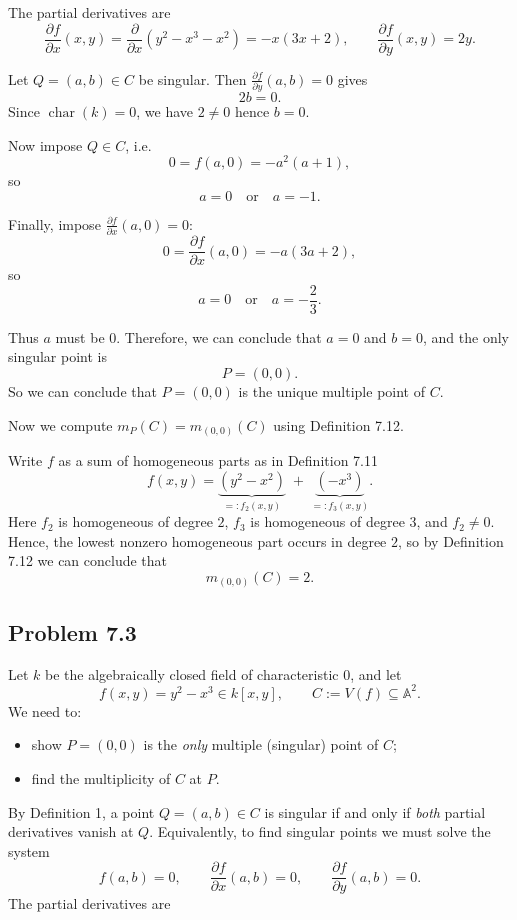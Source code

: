 \documentclass[a4paper,12pt,openany]{article}
\theoremstyle{plain}
\theoremstyle{definition}
\theoremstyle{remark}
\begin{document}
The partial derivatives are 
\[
\frac{\partial f}{\partial x}(x,y)=\frac{\partial}{\partial x}(y^2-x^3-x^2)=-x(3x+2),
\qquad
\frac{\partial f}{\partial y}(x,y)=2y.
\]

Let $Q=(a,b)\in C$ be singular. Then $\frac{\partial f}{\partial y}(a,b)=0$ gives
\[
2b=0.
\]
Since $\operatorname{char}(k)=0$, we have $2\neq 0$ hence $b=0$.

Now impose $Q\in C$, i.e.
\[
0=f(a,0)=-a^{2}(a+1),
\]
so
\[
a=0 \quad\text{or}\quad a=-1.
\]

Finally, impose $\frac{\partial f}{\partial x}(a,0)=0$:
\[
0=\frac{\partial f}{\partial x}(a,0)=-a(3a+2),
\]
so
\[
a=0 \quad\text{or}\quad a=-\frac{2}{3}.
\]

Thus $a$ must be $0$.
Therefore, we can conclude that $a=0$ and $b=0$, and the only singular point is
\[
P=(0,0).
\]
So we can conclude that $P=(0,0)$ is the unique multiple point of $C$.

\medskip


Now we compute $m_{P}(C)=m_{(0,0)}(C)$ using Definition 7.12.

Write $f$ as a sum of homogeneous parts as in Definition 7.11
\[
f(x,y)=\underbrace{(y^{2}-x^{2})}_{=:f_{2}(x,y)} \;+\; \underbrace{(-x^{3})}_{=:f_{3}(x,y)}.
\]
Here $f_2$ is homogeneous of degree $2$, $f_3$ is homogeneous of degree $3$, and $f_2\neq 0$.
Hence, the lowest nonzero homogeneous part occurs in degree $2$, so by Definition 7.12 we can conclude that
\[
m_{(0,0)}(C)=2.
\]



\subsection*{Problem 7.3}

Let $k$ be the algebraically closed field of characteristic $0$, and let
\[
f(x,y)=y^{2}-x^{3}\in k[x,y],
\qquad
C:= V(f)\subseteq \mathbb{A}^{2}.
\]
We need to:
\begin{itemize}
\item[i)]  show $P=(0,0)$ is the \emph{only} multiple (singular) point of $C$;
\item[ii)] find the multiplicity of $C$ at $P$.
\end{itemize}

\medskip

By Definition 1, a point $Q=(a,b)\in C$ is singular if and only if \emph{both} partial derivatives vanish at $Q$.
Equivalently, to find singular points we must solve the system
\[
f(a,b)=0,\qquad \frac{\partial f}{\partial x}(a,b)=0,\qquad \frac{\partial f}{\partial y}(a,b)=0.
\]
The partial derivatives are
\end{document}
